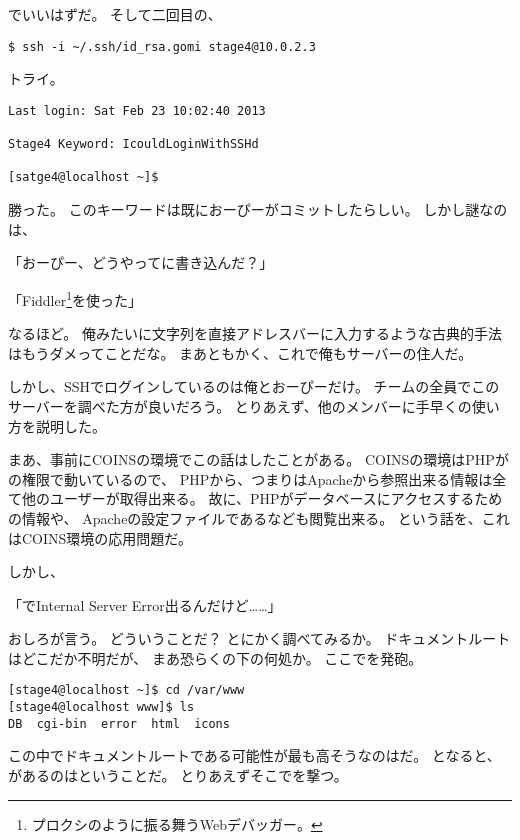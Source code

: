 \begin{multicols}{2}

でいいはずだ。
そして二回目の、

\begin{lstlisting}
$ ssh -i ~/.ssh/id_rsa.gomi stage4@10.0.2.3
\end{lstlisting}

トライ。

\begin{lstlisting}
Last login: Sat Feb 23 10:02:40 2013

Stage4 Keyword: IcouldLoginWithSSHd

[satge4@localhost ~]$
\end{lstlisting}

勝った。
このキーワードは既におーぴーがコミットしたらしい。
しかし謎なのは、

「おーぴー、どうやってに書き込んだ？」

「Fiddler\footnote{プロクシのように振る舞うWebデバッガー。}を使った」

なるほど。
俺みたいに文字列を直接アドレスバーに入力するような古典的手法はもうダメってことだな。
まあともかく、これで俺もサーバーの住人だ。

しかし、SSHでログインしているのは俺とおーぴーだけ。
チームの全員でこのサーバーを調べた方が良いだろう。
とりあえず、他のメンバーに手早くの使い方を説明した。

まあ、事前にCOINSの環境でこの話はしたことがある。
COINSの環境はPHPがの権限で動いているので、
PHPから、つまりはApacheから参照出来る情報は全て他のユーザーが取得出来る。
故に、PHPがデータベースにアクセスするための情報や、
Apacheの設定ファイルであるなども閲覧出来る。
という話を、これはCOINS環境の応用問題だ。

しかし、

「でInternal Server Error出るんだけど……」

おしろが言う。
どういうことだ？
とにかく調べてみるか。
ドキュメントルートはどこだか不明だが、
まあ恐らくの下の何処か。
ここでを発砲。

\begin{lstlisting}
[stage4@localhost ~]$ cd /var/www
[stage4@localhost www]$ ls
DB  cgi-bin  error  html  icons
\end{lstlisting}

この中でドキュメントルートである可能性が最も高そうなのはだ。
となると、があるのはということだ。
とりあえずそこでを撃つ。


\end{multicols}
